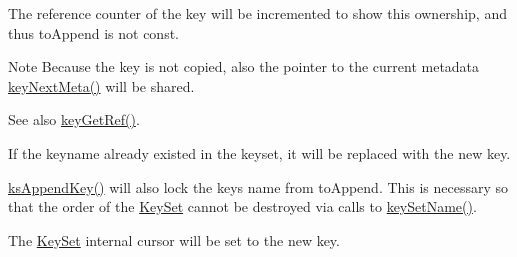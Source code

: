 The reference counter of the key will be incremented to show this ownership, and thus {\ttfamily to\+Append} is not const.

\begin{DoxyNote}{Note}
Because the key is not copied, also the pointer to the current metadata \mbox{\hyperlink{group__keymeta_ga4c88342f580a4291455a801af71ce048}{key\+Next\+Meta()}} will be shared.
\end{DoxyNote}
\begin{DoxySeeAlso}{See also}
\mbox{\hyperlink{group__key_ga4aabc4272506dd63161db2bbb42de8ae}{key\+Get\+Ref()}}.
\end{DoxySeeAlso}
If the keyname already existed in the keyset, it will be replaced with the new key.

\mbox{\hyperlink{group__keyset_gaa5a1d467a4d71041edce68ea7748ce45}{ks\+Append\+Key()}} will also lock the key\textquotesingle{}s name from {\ttfamily to\+Append}. This is necessary so that the order of the \mbox{\hyperlink{classkdb_1_1KeySet}{Key\+Set}} cannot be destroyed via calls to \mbox{\hyperlink{group__keyname_ga7699091610e7f3f43d2949514a4b35d9}{key\+Set\+Name()}}.

The \mbox{\hyperlink{classkdb_1_1KeySet}{Key\+Set}} internal cursor will be set to the new key.

